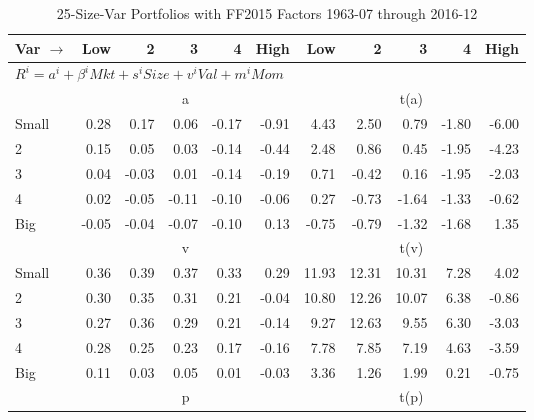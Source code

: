 
\begin{table}[!ht]
\centering
\caption{25-Size-Var Portfolios with FF2015 Factors 1963-07 through 2016-12}
\begin{tabular}{lrrrrrrrrrr}
  \toprule
    Var $\rightarrow$ & Low & 2 & 3 & 4 & High & Low & 2 & 3 & 4 & High \\ 
  \midrule
  \multicolumn{11}{l}{$R^i=a^i+\beta^iMkt+s^iSize+v^iVal+m^iMom$} \\

  
    
      & \multicolumn{5}{c}{a} & \multicolumn{5}{c}{t(a)}
    
    \\
      \cmidrule(r){2-6} \cmidrule(r){7-11}

    Small   & 0.28  & 0.17  & 0.06  & -0.17  & -0.91  & 4.43  & 2.50  & 0.79  & -1.80  & -6.00  \\
         2  & 0.15  & 0.05  & 0.03  & -0.14  & -0.44  & 2.48  & 0.86  & 0.45  & -1.95  & -4.23  \\
         3  & 0.04  & -0.03  & 0.01  & -0.14  & -0.19  & 0.71  & -0.42  & 0.16  & -1.95  & -2.03  \\
         4  & 0.02  & -0.05  & -0.11  & -0.10  & -0.06  & 0.27  & -0.73  & -1.64  & -1.33  & -0.62  \\
    Big     & -0.05  & -0.04  & -0.07  & -0.10  & 0.13  & -0.75  & -0.79  & -1.32  & -1.68  & 1.35  \\

  
    
      & \multicolumn{5}{c}{v} & \multicolumn{5}{c}{t(v)}
    
    \\
      \cmidrule(r){2-6} \cmidrule(r){7-11}

    Small   & 0.36  & 0.39  & 0.37  & 0.33  & 0.29  & 11.93  & 12.31  & 10.31  & 7.28  & 4.02  \\
         2  & 0.30  & 0.35  & 0.31  & 0.21  & -0.04  & 10.80  & 12.26  & 10.07  & 6.38  & -0.86  \\
         3  & 0.27  & 0.36  & 0.29  & 0.21  & -0.14  & 9.27  & 12.63  & 9.55  & 6.30  & -3.03  \\
         4  & 0.28  & 0.25  & 0.23  & 0.17  & -0.16  & 7.78  & 7.85  & 7.19  & 4.63  & -3.59  \\
    Big     & 0.11  & 0.03  & 0.05  & 0.01  & -0.03  & 3.36  & 1.26  & 1.99  & 0.21  & -0.75  \\

  
    
      & \multicolumn{5}{c}{p} & \multicolumn{5}{c}{t(p)}
    

\end{tabular}
\end{table}
